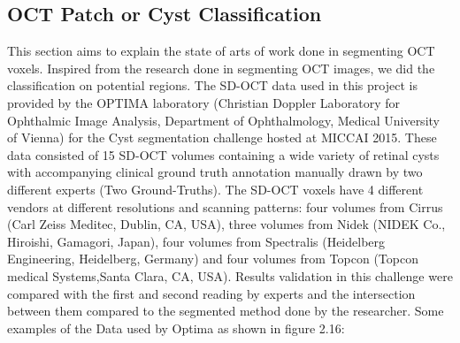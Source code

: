 \subsection{OCT Patch or Cyst Classification}
This section aims to explain the state of arts of work done in segmenting OCT voxels.
Inspired from the research done in segmenting OCT images, we did the classification on potential regions.
The SD-OCT data used in this project is provided by the OPTIMA laboratory (Christian Doppler Laboratory for Ophthalmic Image Analysis, Department of Ophthalmology, Medical University of Vienna) for the Cyst segmentation challenge hosted at MICCAI 2015.
These data consisted of 15 SD-OCT volumes containing a wide variety of retinal cysts with accompanying clinical ground truth annotation manually drawn by two different experts (Two Ground-Truths).
The SD-OCT voxels have 4 different vendors at different resolutions and scanning patterns: four volumes from Cirrus (Carl Zeiss Meditec, Dublin, CA, USA), three volumes from Nidek (NIDEK Co., Hiroishi, Gamagori, Japan), four volumes from Spectralis (Heidelberg Engineering, Heidelberg, Germany) and four volumes from Topcon (Topcon medical Systems,Santa Clara, CA, USA).
Results validation in this challenge were compared with the first and second reading by experts and the intersection between them compared to the segmented method done by the researcher.
Some examples of the Data used by Optima as shown in figure 2.16:
